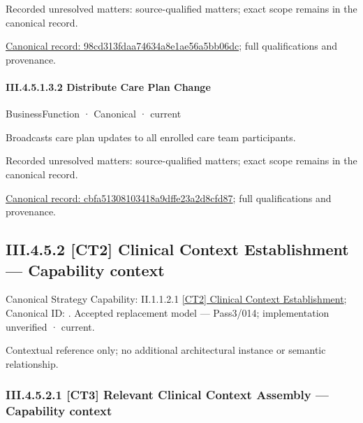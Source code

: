 {\small Recorded unresolved matters: source-qualified matters; exact scope remains in the canonical record.}\par
{\footnotesize \href{../../../../../../../../continuum/business/business-function/98cd313fdaa74634a8e1ae56a5bb06dc.md}{Canonical record: 98cd313fdaa74634a8e1ae56a5bb06dc}; full qualifications and provenance.}\par
\paragraph*{III.4.5.1.3.2 Distribute Care Plan Change}
\label{navigation:III.4.5.1.3.2}

\label{element:cbfa51308103418a9dffe23a2d8cfd87}
{\small BusinessFunction · Canonical · current}\par

Broadcasts care plan updates to all enrolled care team participants.


{\small Recorded unresolved matters: source-qualified matters; exact scope remains in the canonical record.}\par
{\footnotesize \href{../../../../../../../../continuum/business/business-function/cbfa51308103418a9dffe23a2d8cfd87.md}{Canonical record: cbfa51308103418a9dffe23a2d8cfd87}; full qualifications and provenance.}\par
\subsection*{III.4.5.2 [CT2] Clinical Context Establishment — Capability context}
\label{navigation:III.4.5.2}

{\small Canonical Strategy Capability: II.1.1.2.1 \hyperref[element:7b398aa81bbc43e7a3868e5d85e30a1d]{[CT2] Clinical Context Establishment}; Canonical ID: \texttt{}. Accepted replacement model — Pass3/014; implementation unverified · current.}\par
Contextual reference only; no additional architectural instance or semantic relationship.\par
\subsubsection*{III.4.5.2.1 [CT3] Relevant Clinical Context Assembly — Capability context}
\label{navigation:III.4.5.2.1}

